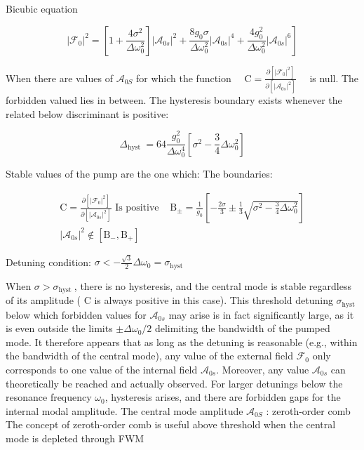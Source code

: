 \documentclass[main.tex]{subfiles}
\begin{document}
Bicubic equation

$$
\left.\left|\mathcal{F}_0\right|^2=\left[1+\frac{4 \sigma^2}{\Delta \omega_0^2}\right]\left|\mathcal{A}_{0 s}\right|^2+\frac{8 g_0 \sigma}{\Delta \omega_0^2}\left|\mathcal{A}_{0 s}\right|^4+\frac{4 g_0^2}{\Delta \omega_0^2}\left|\mathcal{A}_{0 s}\right|^6\right]
$$ 

When there are values of $\mathcal{A}_{0 S}$ for which the function $\quad \mathrm{C}=\frac{\partial\left[\left|\mathcal{F}_0\right|^2\right]}{\partial\left[\left|\mathcal{A}_{0 s}\right|^2\right]} \quad$ is null.
The forbidden valued lies in between. The hysteresis boundary exists whenever the related below discriminant is positive:

$$
\Delta_{\text {hyst }}=64 \frac{g_0^2}{\Delta \omega_0^4}\left[\sigma^2-\frac{3}{4} \Delta \omega_0^2\right]
$$

Stable values of the pump are the one which:
The boundaries:

$$
\begin{array}{ll}
\mathrm{C}=\frac{\partial\left[\left|\mathcal{F}_0\right|^2\right]}{\partial\left[\left|\mathcal{A}_{0 s}\right|^2\right]} \text { Is positive } & \mathrm{B}_{\pm}=\frac{1}{g_0}\left[-\frac{2 \sigma}{3} \pm \frac{1}{3} \sqrt{\sigma^2-\frac{3}{4} \Delta \omega_0^2}\right] \\
\left|\mathcal{A}_{0 s}\right|^2 \notin\left[\mathrm{B}_{-}, \mathrm{B}_{+}\right] &
\end{array}
$$

Detuning condition: $\sigma<-\frac{\sqrt{3}}{2} \Delta \omega_0=\sigma_{\mathrm{hyst}}$

When $\sigma>\sigma_{\text {hyst }}$, there is no hysteresis, and the central mode is stable regardless of its amplitude ( $\mathrm{C}$ is always positive in this case). This threshold detuning $\sigma_{\text {hyst }}$ below which forbidden values for $\mathcal{A}_{0 s}$ may arise is in fact significantly large, as it is even outside the limits $\pm \Delta \omega_0 / 2$ delimiting the bandwidth of the pumped mode. It therefore appears that as long as the detuning is reasonable (e.g., within the bandwidth of the central mode), any value of the external field $\mathcal{F}_0$ only corresponds to one value of the internal field $\mathcal{A}_{0 s}$. Moreover, any value $\mathcal{A}_{0 s}$ can theoretically be reached and actually observed. For larger detunings below the resonance frequency $\omega_0$, hysteresis arises, and there are forbidden gaps for the internal modal amplitude.
The central mode amplitude $\mathcal{A}_{0 S}$ : zeroth-order comb
The concept of zeroth-order comb is useful above threshold when the central mode is depleted through FWM
\end{document}
